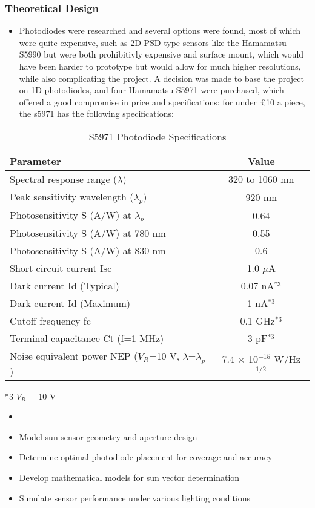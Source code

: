\subsubsection*{Theoretical Design}
\begin{itemize}
  \item Photodiodes were researched and several options were found, most of which were quite expensive, such as 2D PSD type sensors like the Hamamatsu S5990 but were both prohibitivly expensive and surface mount, which would have been harder to prototype but would allow for much higher resolutions, while also complicating the project. A decision was made to base the project on 1D photodiodes, and four Hamamatsu S5971 were purchased, which offered a good compromise in price and specifications: for under £10 a piece, the s5971 has the following specifications:
\end{itemize}
\begin{table}[h]
  \centering
  \caption{S5971 Photodiode Specifications}
  \begin{tabular}{|l|c|}
  \hline
  \textbf{Parameter} & \textbf{Value} \\
  \hline
  Spectral response range ($\lambda$) & 320 to 1060 nm \\
  \hline
  Peak sensitivity wavelength ($\lambda_p$) & 920 nm \\
  \hline
  Photosensitivity S (A/W) at $\lambda_p$ & 0.64 \\
  \hline
  Photosensitivity S (A/W) at 780 nm & 0.55 \\
  \hline
  Photosensitivity S (A/W) at 830 nm & 0.6 \\
  \hline
  Short circuit current Isc & 1.0 $\mu$A \\
  \hline
  Dark current Id (Typical) & 0.07 nA$^{*3}$ \\
  \hline
  Dark current Id (Maximum) & 1 nA$^{*3}$ \\
  \hline
  Cutoff frequency fc & 0.1 GHz$^{*3}$ \\
  \hline
  Terminal capacitance Ct (f=1 MHz) & 3 pF$^{*3}$ \\
  \hline
  Noise equivalent power NEP ($V_R$=10 V, $\lambda$=$\lambda_p$) & 7.4 $\times$ 10$^{-15}$ W/Hz$^{1/2}$ \\
  \hline
  \end{tabular}
  \begin{tablenotes}
  \small
  \item[*3] $V_R$ = 10 V
  \end{tablenotes}
  \end{table}
\begin{itemize}
  \item 
  \item Model sun sensor geometry and aperture design
  \item Determine optimal photodiode placement for coverage and accuracy
  \item Develop mathematical models for sun vector determination
  \item Simulate sensor performance under various lighting conditions
\end{itemize}

